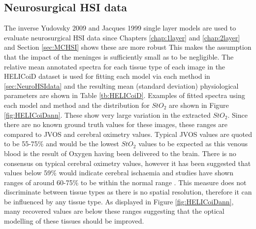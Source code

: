 \subsection{Neurosurgical HSI data}
The inverse Yudovsky 2009 and Jacques 1999 single layer models are used to evaluate neurosurgical HSI data since Chapters \ref{chap:1layer} and \ref{chap:2layer} and Section \ref{sec:MCHSI} shows these are more robust
This makes the assumption that the impact of the meninges is sufficiently small as to be negligible. 
The relative mean annotated spectra for each tissue type of each image in the HELICoiD dataset is used for fitting each model via each method in \ref{sec:NeuroHSIdata} and the resulting mean (standard deviation) physiological parameters are shown in Table \ref{tb:HELICoiD}. Examples of fitted spectra using each model and method and the distribution for $StO_2$ are shown in Figure \ref{fig:HELICoiDann}. These show very large variation in the extracted $StO_2$. Since there are no known ground truth values for these images, these ranges are compared to JVOS and cerebral oximetry values. Typical JVOS values are quoted to be 55-75\% \cite{Raith2020, Zhong2021} and would be the lowest $StO_2$ values to be expected as this venous blood is the result of Oxygen having been delivered to the brain. There is no consensus on typical cerebral oximetry values, however it has been suggested that values below 59\% would indicate cerebral ischaemia \cite{Zhong2021} and studies have shown ranges of around 60-75\% to be within the normal range \cite{Lian2020}. This measure does not discriminate between tissue types as there is no spatial resolution, therefore it can be influenced by any tissue type. As displayed in Figure \ref{fig:HELICoiDann}, many recovered values are below these ranges suggesting that the optical modelling of these tissues should be improved.

